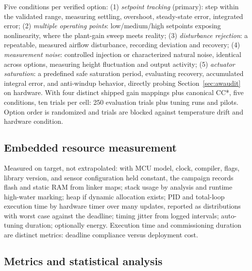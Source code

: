 \documentclass[10pt,twocolumn]{article}
\begin{document}
Five conditions per verified option: (1) \emph{setpoint tracking} (primary): step within the validated range, measuring settling, overshoot, steady-state error, integrated error; (2) \emph{multiple operating points}: low/medium/high setpoints exposing nonlinearity, where the plant-gain sweep meets reality; (3) \emph{disturbance rejection}: a repeatable, measured airflow disturbance, recording deviation and recovery; (4) \emph{measurement noise}: controlled injection or characterized natural noise, identical across options, measuring height fluctuation and output activity; (5) \emph{actuator saturation}: a predefined safe saturation period, evaluating recovery, accumulated integral error, and anti-windup behavior, directly probing Section~\ref{sec:awaudit} on hardware. With four distinct shipped gain mappings plus canonical CC*, five conditions, ten trials per cell: 250 evaluation trials plus tuning runs and pilots. Option order is randomized and trials are blocked against temperature drift and hardware condition.

\subsection{Embedded resource measurement}

Measured on target, not extrapolated: with MCU model, clock, compiler, flags, library version, and sensor configuration held constant, the campaign records flash and static RAM from linker maps; stack usage by analysis and runtime high-water marking; heap if dynamic allocation exists; PID and total-loop execution time by hardware timer over many updates, reported as distributions with worst case against the deadline; timing jitter from logged intervals; auto-tuning duration; optionally energy. Execution time and commissioning duration are distinct metrics: deadline compliance versus deployment cost.

\subsection{Metrics and statistical analysis}
\end{document}

